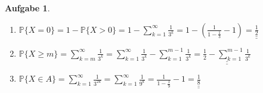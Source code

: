 \documentclass[11pt]{article}
\theoremstyle{break}
\newtheorem{task}{Aufgabe}
\newcommand{\set}[1]{\ensuremath{\{#1\}}}
\begin{document}
\begin{task}
    \hfill\vspace{-5mm}
    \begin{enumerate}[label={(\alph*)}]
        \item $\mathbb{P}\set{X=0} = 1 - \mathbb{P}\set{X>0} = 1 - \sum\limits_{k=1}^{\infty}\frac{1}{3^k} = 1 - \left(\frac{1}{1-\frac{1}{3}}-1\right) = \underline{\underline{\frac{1}{2}}}$
        \item $\mathbb{P}\set{X\geq m} = \sum\limits_{k=m}^{\infty}\frac{1}{3^k} = \sum\limits_{k=1}^{\infty}\frac{1}{3^k} - \sum\limits_{k=1}^{m-1}\frac{1}{3^k} = \underline{\underline{\frac{1}{2} - \sum\limits_{k=1}^{m-1}\frac{1}{3^k}}}$
        \item $\mathbb{P}\set{X\in A} = \sum\limits_{k=1}^{\infty}\frac{1}{3^{2k}} = \sum\limits_{k=1}^{\infty}\frac{1}{9^k} = \frac{1}{1 - \frac{1}{9}} - 1 = \underline{\underline{\frac{1}{8}}}$
    \end{enumerate}
\end{task}
\end{document}
